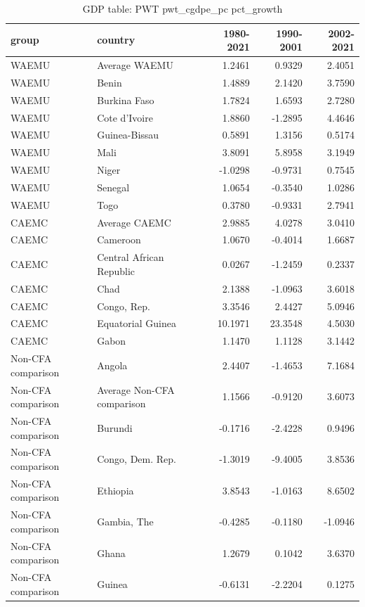 \begin{table}

\caption{GDP table: PWT pwt_cgdpe_pc pct_growth}
\centering
\begin{tabular}[t]{llrrr}
\toprule
group & country & 1980-2021 & 1990-2001 & 2002-2021\\
\midrule
WAEMU & Average WAEMU & 1.2461 & 0.9329 & 2.4051\\
WAEMU & Benin & 1.4889 & 2.1420 & 3.7590\\
WAEMU & Burkina Faso & 1.7824 & 1.6593 & 2.7280\\
WAEMU & Cote d'Ivoire & 1.8860 & -1.2895 & 4.4646\\
WAEMU & Guinea-Bissau & 0.5891 & 1.3156 & 0.5174\\
\addlinespace
WAEMU & Mali & 3.8091 & 5.8958 & 3.1949\\
WAEMU & Niger & -1.0298 & -0.9731 & 0.7545\\
WAEMU & Senegal & 1.0654 & -0.3540 & 1.0286\\
WAEMU & Togo & 0.3780 & -0.9331 & 2.7941\\
CAEMC & Average CAEMC & 2.9885 & 4.0278 & 3.0410\\
\addlinespace
CAEMC & Cameroon & 1.0670 & -0.4014 & 1.6687\\
CAEMC & Central African Republic & 0.0267 & -1.2459 & 0.2337\\
CAEMC & Chad & 2.1388 & -1.0963 & 3.6018\\
CAEMC & Congo, Rep. & 3.3546 & 2.4427 & 5.0946\\
CAEMC & Equatorial Guinea & 10.1971 & 23.3548 & 4.5030\\
\addlinespace
CAEMC & Gabon & 1.1470 & 1.1128 & 3.1442\\
Non-CFA comparison & Angola & 2.4407 & -1.4653 & 7.1684\\
Non-CFA comparison & Average Non-CFA comparison & 1.1566 & -0.9120 & 3.6073\\
Non-CFA comparison & Burundi & -0.1716 & -2.4228 & 0.9496\\
Non-CFA comparison & Congo, Dem. Rep. & -1.3019 & -9.4005 & 3.8536\\
\addlinespace
Non-CFA comparison & Ethiopia & 3.8543 & -1.0163 & 8.6502\\
Non-CFA comparison & Gambia, The & -0.4285 & -0.1180 & -1.0946\\
Non-CFA comparison & Ghana & 1.2679 & 0.1042 & 3.6370\\
Non-CFA comparison & Guinea & -0.6131 & -2.2204 & 0.1275\\

\end{tabular}
\end{table}
